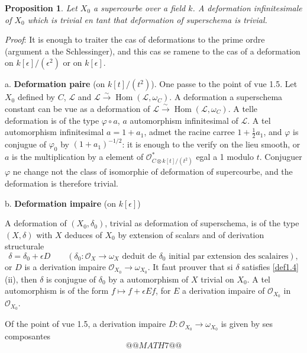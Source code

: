 \documentclass[11pt,a4paper]{article}
\theoremstyle{plain}
\newtheorem{proposition}[theorem]{Proposition}
\theoremstyle{definition}
\DeclareMathOperator{\Hom}{Hom}
\begin{document}
\begin{proposition}\label{prop1.7}
Let $X_0$ a supercourbe over a field $k$. A deformation infinitesimale of $X_0$ which is trivial en tant that deformation of superschema is trivial.
\end{proposition}

\noindent \textit{Proof}: It is enough to traiter the cas of deformations to the prime ordre (argument a the Schlessinger), and this cas se ramene to the cas of a deformation on $k[\epsilon]/(\epsilon^2)$ or on $k[\epsilon]$.

\medskip

\noindent a. \textbf{Deformation paire} (on $k[t]/(t^2)$). One passe to the point of vue 1.5. Let $X_0$ defined by $C$, $\mathcal{L}$ and $\mathcal{L} \xrightarrow{\sim} \Hom(\mathcal{L},\omega_C)$. A deformation a superschema constant can be vue as a deformation of $\mathcal{L} \xrightarrow{\sim} \Hom(\mathcal{L},\omega_C)$. A telle deformation is of the type $\varphi \circ a$, $a$ automorphism infinitesimal of $\mathcal{L}$. A tel automorphism infinitesimal $a = 1 + a_1$, admet the racine carree $1 + \frac{1}{2}a_1$, and $\varphi$ is conjugue of $\varphi_0$ by $(1+a_1)^{-1/2}$: it is enough to the verify on the lieu smooth, or $a$ is the multiplication by a element of $\mathcal{O}_{C \otimes k[t]/(t^2)}^*$ egal a 1 modulo $t$. Conjuguer $\varphi$ ne change not the class of isomorphie of deformation of supercourbe, and the deformation is therefore trivial.

\newpage

\noindent b. \textbf{Deformation impaire} (on $k[\epsilon]$)

A deformation of $(X_0, \delta_0)$, trivial as deformation of superschema, is of the type $(X,\delta)$ with $X$ deduces of $X_0$ by extension of scalars and of derivation structurale
\[
\delta = \delta_0 + \epsilon D \qquad (\delta_0 : \mathcal{O}_X \to \omega_X \text{ deduit de } \delta_0 \text{ initial par extension des scalaires}),
\]
or $D$ is a derivation impaire $\mathcal{O}_{X_0} \to \omega_{X_0}$. It faut prouver that si $\delta$ satisfies \ref{def1.4}(ii), then $\delta$ is conjugue of $\delta_0$ by a automorphism of $X$ trivial on $X_0$. A tel automorphism is of the form $f \mapsto f + \epsilon Ef$, for $E$ a derivation impaire of $\mathcal{O}_{X_0}$ in $\mathcal{O}_{X_0}$.

Of the point of vue 1.5, a derivation impaire $D : \mathcal{O}_{X_0} \to \omega_{X_0}$ is given by ses composantes
\[
@@MATH7@@
\]
\end{document}
